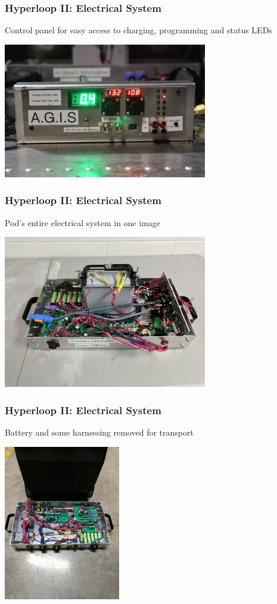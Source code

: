 \documentclass{beamer}
\begin{document}
\begin{frame}
\frametitle{Hyperloop II: Electrical System}
    Control panel for easy access to charging, programming and status LEDs
\begin{center}
    \includegraphics[width=3.5in]{assets/electrical_system/panel}
\end{center}
\end{frame}

\begin{frame}
\frametitle{Hyperloop II: Electrical System}
    Pod's entire electrical system in one image
\begin{center}
    \includegraphics[width=3.5in]{assets/electrical_system/portability1}
\end{center}
\end{frame}

\begin{frame}
\frametitle{Hyperloop II: Electrical System}
    Battery and some harnessing removed for transport
\begin{center}
    \includegraphics[width=2in]{assets/electrical_system/portability2}
\end{center}
\end{frame}
\end{document}
